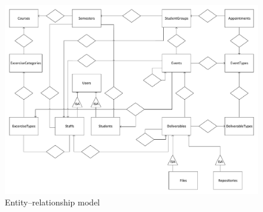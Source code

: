  

\begin{landscape}
	
	\begin{figure}[!htbp]
		\centering
		\includegraphics[width=1.3\textheight]{figures/ER.pdf}
		\caption[Entity–relationship model]{Entity–relationship model}
		\label{fig:er}
	\end{figure}
\end{landscape}



